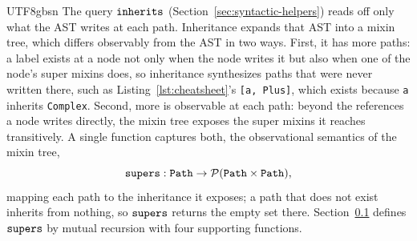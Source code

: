 \begin{CJK*}{UTF8}{gbsn}
The query $\mathtt{inherits}$ (Section~\ref{sec:syntactic-helpers}) reads off only
what the AST writes at each path. Inheritance expands that AST into a mixin
tree, which differs observably from the AST in two ways. First, it has more paths: a
label exists at a node not only when the node writes it but also when one of the
node's super mixins does, so inheritance synthesizes paths that were never written
there, such as Listing~\ref{lst:cheatsheet}'s \texttt{[a, Plus]},
which exists because \texttt{a} inherits \texttt{Complex}.
Second, more is observable at each path: beyond the references a node writes
directly, the mixin tree exposes the super mixins it reaches transitively.
A single function captures both, the observational semantics of the mixin
tree,
\begin{equation}\label{eq:supers-signature}
  \mathtt{supers} : \mathtt{Path} \to \mathcal{P}(\mathtt{Path} \times \mathtt{Path}),
\end{equation}
mapping each path to the inheritance it exposes; a path that does not exist
inherits from nothing, so $\mathtt{supers}$ returns the empty set there.
Section~\ref{sec:definitions} defines $\mathtt{supers}$ by mutual recursion with four
supporting functions.
\fi

\subsection{}
\label{sec:definitions}





\end{CJK*}
